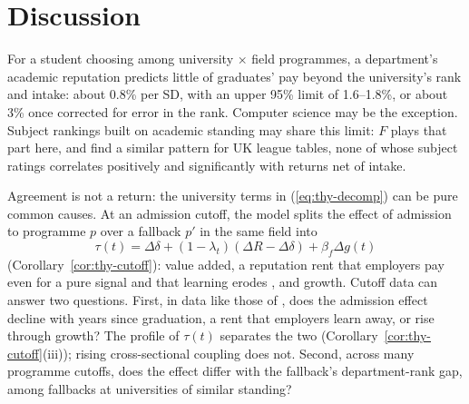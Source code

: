 \documentclass[11pt]{article}
\begin{document}
\section{Discussion}\label{sec:discussion}

For a student choosing among university $\times$ field programmes, a department's academic reputation predicts little
of graduates' pay beyond the university's rank and intake: about 0.8\% per SD, with an upper 95\% limit of
1.6--1.8\%, or about 3\% once corrected for error in the rank. Computer science may be the exception. Subject
rankings built on academic standing may share this limit: $F$ plays that part here, and \citet{britton2022how} find a
similar pattern for UK league tables, none of whose subject ratings correlates positively and significantly with
returns net of intake.

Agreement is not a return: the university terms in (\ref{eq:thy-decomp}) can be pure common causes. At an
admission cutoff, the model splits the effect of admission to programme $p$ over a fallback $p'$ in the same field
into
\begin{equation}\label{eq:thy-cutoff}
\tau(t)=\Delta\delta+(1-\lambda_t)(\Delta R-\Delta\delta)+\beta_f\Delta g(t)
\end{equation}
(Corollary~\ref{cor:thy-cutoff}): value added, a reputation rent that employers pay even for a pure signal and that
learning erodes \citep{altonji2001employer, arcidiacono2010beyond, macleod2017big}, and growth. Cutoff data can
answer two questions. First, in data like those of \citet{anelli2020returns}, does the admission effect decline with years
since graduation, a rent that employers learn away, or rise through growth? The profile of $\tau(t)$ separates the two
(Corollary~\ref{cor:thy-cutoff}(iii)); rising cross-sectional coupling does not. Second, across many programme
cutoffs, does the effect differ with the fallback's department-rank gap, among fallbacks at universities of similar
standing?
\end{document}
